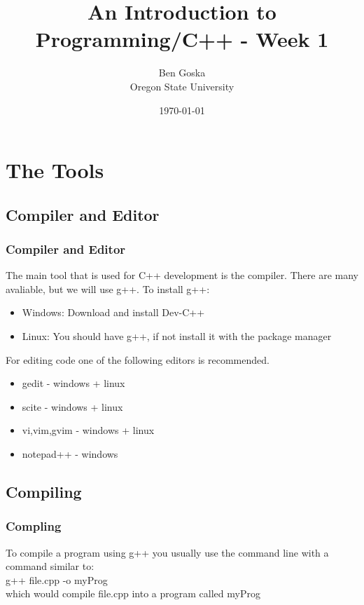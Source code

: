 \documentclass{beamer}
\title{An Introduction to Programming/C++ - Week 1}
\author{Ben Goska \\ Oregon State University}
\date{\today}
\begin{document}
\lstset{language=c++,
        numbers=left,
        showspaces=false,
	showstringspaces=false,
	basicstyle=\footnotesize
	}

\begin{frame}
	\titlepage
\end{frame}

\section[Outline]{}
\frame{\tableofcontents}

\section{The Tools}

\subsection{Compiler and Editor}

\begin{frame}
	\frametitle{Compiler and Editor}
	The main tool that is used for C++ development is the compiler. There
	are many avaliable, but we will use g++. To install g++:
	\begin{itemize}
		\item Windows: Download and install Dev-C++
		\item Linux: You should have g++, if not install it with the package manager
	\end{itemize}
	For editing code one of the following editors is recommended.
	\begin{itemize}
		\item gedit - windows + linux
		\item scite - windows + linux
		\item vi,vim,gvim - windows + linux
		\item notepad++ - windows
	\end{itemize}
\end{frame}

\subsection{Compiling}

\begin{frame}
	\frametitle{Compling}
	To compile a program using g++ you usually use the command line with a command 
	similar to: \\
	g++ file.cpp -o myProg \\
	which would compile file.cpp into a program called myProg
\end{frame}
\end{document}
